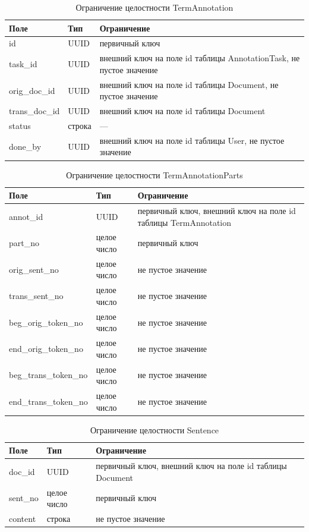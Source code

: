 \begin{table}[H]
\centering
\caption{Ограничение целостности TermAnnotation}
\begin{tabular}{|m{3cm}|m{3cm}|m{6cm}|}
\hline
\textbf{Поле} & \textbf{Тип} & \textbf{Ограничение} \\ \hline
id & UUID & первичный ключ \\ \hline
task\_id & UUID & внешний ключ на поле id таблицы AnnotationTask, не пустое значение \\ \hline
orig\_doc\_id & UUID & внешний ключ на поле id таблицы Document, не пустое значение \\ \hline
trans\_doc\_id & UUID & внешний ключ на поле id таблицы Document \\ \hline
status & строка & --- \\ \hline
done\_by & UUID & внешний ключ на поле id таблицы User, не пустое значение \\ \hline
\end{tabular}
\label{tab:termannot}
\end{table}

\begin{table}[H]
\centering
\caption{Ограничение целостности TermAnnotationParts}
\begin{tabular}{|m{5cm}|m{3cm}|m{6cm}|}
\hline
\textbf{Поле} & \textbf{Тип} & \textbf{Ограничение} \\ \hline
annot\_id & UUID & первичный ключ, внешний ключ на поле id таблицы TermAnnotation \\ \hline
part\_no & целое число & первичный ключ \\ \hline
orig\_sent\_no & целое число & не пустое значение \\ \hline
trans\_sent\_no & целое число & не пустое значение \\ \hline
beg\_orig\_token\_no & целое число & не пустое значение \\ \hline
end\_orig\_token\_no & целое число & не пустое значение \\ \hline
beg\_trans\_token\_no & целое число & не пустое значение \\ \hline
end\_trans\_token\_no & целое число & не пустое значение \\ \hline
\end{tabular}
\label{tab:termannotparts}
\end{table}

\begin{table}[H]
\centering
\caption{Ограничение целостности Sentence}
\begin{tabular}{|m{3cm}|m{3cm}|m{6cm}|}
\hline
\textbf{Поле} & \textbf{Тип} & \textbf{Ограничение} \\ \hline
doc\_id & UUID & первичный ключ, внешний ключ на поле id таблицы Document \\ \hline
sent\_no & целое число & первичный ключ \\ \hline
content & строка & не пустое значение \\ \hline
\end{tabular}
\label{tab:sent}
\end{table}

